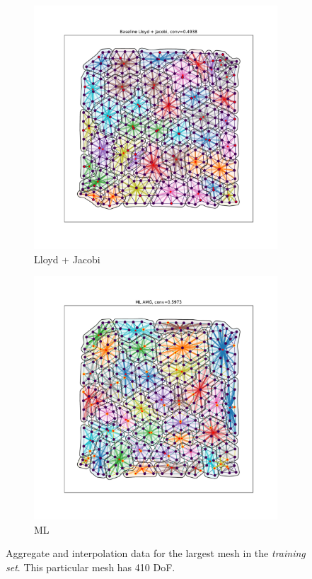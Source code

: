 \documentclass{article}
\begin{document}
\begin{figure}[h]
  \centering
  \begin{subfigure}[t]{0.49\textwidth}
    \centering
    \includegraphics[width=\textwidth, trim=80 70 70 50, clip]{grid_largest_lloyd.pdf}
    \caption{Lloyd + Jacobi}
  \end{subfigure}
  \begin{subfigure}[t]{0.49\textwidth}
    \centering
    \includegraphics[width=\textwidth, trim=80 70 70 50, clip]{grid_largest_ml.pdf}
    \caption{ML}
  \end{subfigure}
  \caption{Aggregate and interpolation data for the largest mesh in the \textit{training set}.  This particular mesh has 410 DoF.}
  \label{fig:gridlargest}
\end{figure}
\end{document}
